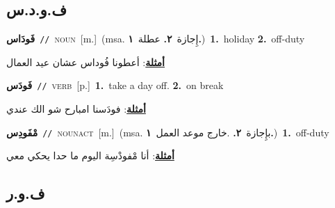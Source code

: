 \documentclass[10pt,a4paper,twoside]{article} %
\begin{document}
\begin{multicols}{2}
\vspace{-3mm}
\subsection*{\color{blue}\foreignlanguage{arabic}{ف.و.د.س}\color{blue}{ (ntws)}} 

{\setlength\topsep{0pt}\textbf{\foreignlanguage{arabic}{فَودَاس}}\ {\color{gray}\texttt{//}\color{black}}\ \textsc{noun}\ [m.]\ \color{gray}(msa. \foreignlanguage{arabic}{إِجازة}~\foreignlanguage{arabic}{\textbf{٢.}}  \foreignlanguage{arabic}{عطلة}~\foreignlanguage{arabic}{\textbf{١.}})\color{black}\ \textbf{1.}~holiday  \textbf{2.}~off-duty\  \begin{flushright}\color{gray}\foreignlanguage{arabic}{\textbf{\underline{\foreignlanguage{arabic}{أمثلة}}}: أعطونا فُوداس عشان عيد العمال}\end{flushright}\color{black}} \vspace{2mm}

{\setlength\topsep{0pt}\textbf{\foreignlanguage{arabic}{فَودَس}}\ {\color{gray}\texttt{//}\color{black}}\ \textsc{verb}\ [p.]\ \textbf{1.}~take a day off.  \textbf{2.}~on break\  \begin{flushright}\color{gray}\foreignlanguage{arabic}{\textbf{\underline{\foreignlanguage{arabic}{أمثلة}}}: فودَسنا امبارح شو الك عندي}\end{flushright}\color{black}} \vspace{2mm}

{\setlength\topsep{0pt}\textbf{\foreignlanguage{arabic}{مْفَودِس}}\ {\color{gray}\texttt{//}\color{black}}\ \textsc{noun\textunderscore act}\ [m.]\ \color{gray}(msa. \foreignlanguage{arabic}{بإِجازة}~\foreignlanguage{arabic}{\textbf{٢.}}  .\foreignlanguage{arabic}{خارج موعد العمل}~\foreignlanguage{arabic}{\textbf{١.}})\color{black}\ \textbf{1.}~off-duty\  \begin{flushright}\color{gray}\foreignlanguage{arabic}{\textbf{\underline{\foreignlanguage{arabic}{أمثلة}}}: أنا مْفودْسِة اليوم ما حدا يحكي معي}\end{flushright}\color{black}} \vspace{2mm}

\vspace{-3mm}
\subsection*{\color{blue}\foreignlanguage{arabic}{ف.و.ر}\color{blue}{}} 


\end{multicols}
\end{document}
